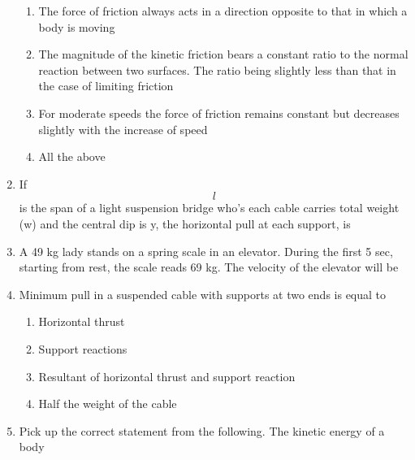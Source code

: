 \documentclass[11pt,a4paper]{article}
\begin{document}
\begin{enumerate}
\begin{enumerate}[label=\Alph*.]
\item{The force of friction always acts in a direction opposite to that in which a body is moving}
\item{The magnitude of the kinetic friction bears a constant ratio to the normal reaction between two surfaces. The ratio being slightly less than that in the case of limiting friction}
\item{For moderate speeds the force of friction remains constant but decreases slightly with the increase of speed}
\item{All the above}
\end{enumerate}
\item{If $$l$$ is the span of a light suspension bridge who's each cable carries total weight (w) and the central dip is y, the horizontal pull at each support, is
}
\\
\item{A 49 kg lady stands on a spring scale in an elevator. During the first 5 sec, starting from rest, the scale reads 69 kg. The velocity of the elevator will be}
\\
\item{Minimum pull in a suspended cable with supports at two ends is equal to}
\begin{enumerate}[label=\Alph*.]
\item{Horizontal thrust}
\item{Support reactions}
\item{Resultant of horizontal thrust and support reaction}
\item{Half the weight of the cable}
\end{enumerate}
\item{Pick up the correct statement from the following. The kinetic energy of a body}

\end{enumerate}
\end{document}
